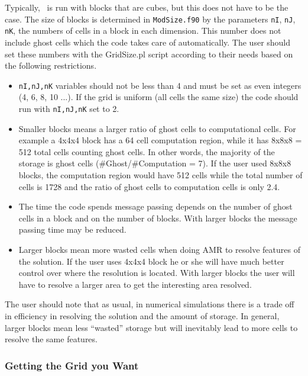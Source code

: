Typically, \BATSRUS\ is run with blocks that are cubes, 
but this does not have to be the case.  
The size of blocks is determined in {\tt ModSize.f90} by the parameters 
{\tt nI}, {\tt nJ}, {\tt nK}, the numbers of cells in a block
in each dimension.  This number does not include ghost cells which the code
takes care of automatically.  The user should set these numbers with the 
GridSize.pl script according to
their needs based on the following restrictions.
\begin{itemize}
\item {\tt nI,nJ,nK} variables should not be less than 4 and must be set as even
      integers (4, 6, 8, 10 ...). If the grid is uniform (all cells the same size)
      the code should run with {\tt nI,nJ,nK} set to 2.
\item Smaller blocks means a larger ratio of ghost cells to computational cells.
      For example a 4x4x4 block has a 64 cell computation region, while
      it has 8x8x8 = 512 total cells counting ghost cells.  In other words,
      the majority of the storage is ghost cells (\#Ghost/\#Computation = 7).
      If the user used 8x8x8 blocks, the computation region would have 512 
      cells while the total number of cells is 1728 and the ratio of ghost cells
      to computation cells is only 2.4.
\item The time the code spends message passing depends on the number of
      ghost cells in a block and on the number of blocks.  With larger blocks
      the message passing time may be reduced.
\item Larger blocks mean more wasted cells when doing AMR to resolve
      features of the solution.  If the user uses 4x4x4 block he or she will
      have much better control over where the resolution is located.  With larger
      blocks the user will have to resolve a larger area to get the interesting
      area resolved.
\end{itemize}
The user should note that as usual, in numerical simulations there is a trade off
in efficiency in resolving the solution and the amount of storage.  In general,
larger blocks mean less ``wasted'' storage but will inevitably lead to more cells
to resolve the same features.

\subsubsection{Getting the Grid you Want \label{section:proc_dims}}

